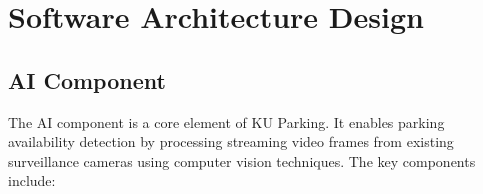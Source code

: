 \chapter{Software Architecture Design}





\section{AI Component}
\label{section:ai-component}

The AI component is a core element of KU Parking. 
It enables parking availability detection by processing streaming video frames from existing surveillance cameras using computer vision techniques. 
The key components include:

